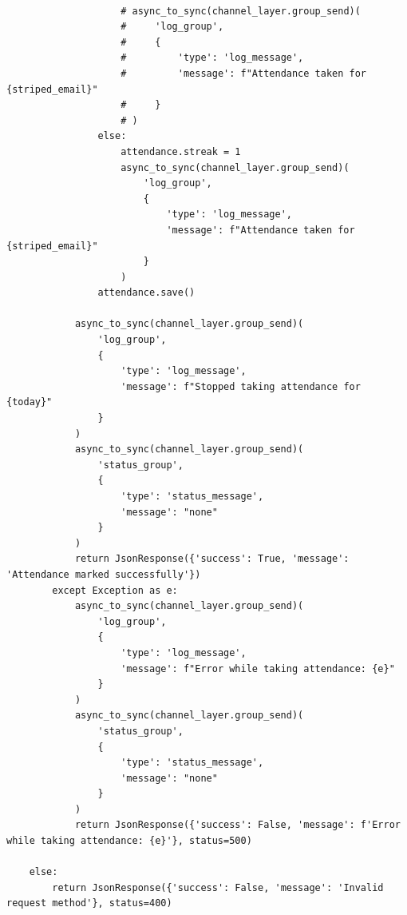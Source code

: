 \begin{itemize}
\begin{verbatim}
          
                    # async_to_sync(channel_layer.group_send)(
                    #     'log_group',
                    #     {
                    #         'type': 'log_message',
                    #         'message': f"Attendance taken for {striped_email}"
                    #     }
                    # )
                else:
                    attendance.streak = 1
                    async_to_sync(channel_layer.group_send)(
                        'log_group',
                        {
                            'type': 'log_message',
                            'message': f"Attendance taken for {striped_email}"
                        }
                    )
                attendance.save()

            async_to_sync(channel_layer.group_send)(
                'log_group',
                {
                    'type': 'log_message',
                    'message': f"Stopped taking attendance for {today}"
                }
            )
            async_to_sync(channel_layer.group_send)(
                'status_group',
                {
                    'type': 'status_message',
                    'message': "none"
                }
            )
            return JsonResponse({'success': True, 'message': 'Attendance marked successfully'})
        except Exception as e:
            async_to_sync(channel_layer.group_send)(
                'log_group',
                {
                    'type': 'log_message',
                    'message': f"Error while taking attendance: {e}"
                }
            )
            async_to_sync(channel_layer.group_send)(
                'status_group',
                {
                    'type': 'status_message',
                    'message': "none"
                }
            )
            return JsonResponse({'success': False, 'message': f'Error while taking attendance: {e}'}, status=500)

    else:
        return JsonResponse({'success': False, 'message': 'Invalid request method'}, status=400)

\end{verbatim}

\end{itemize}